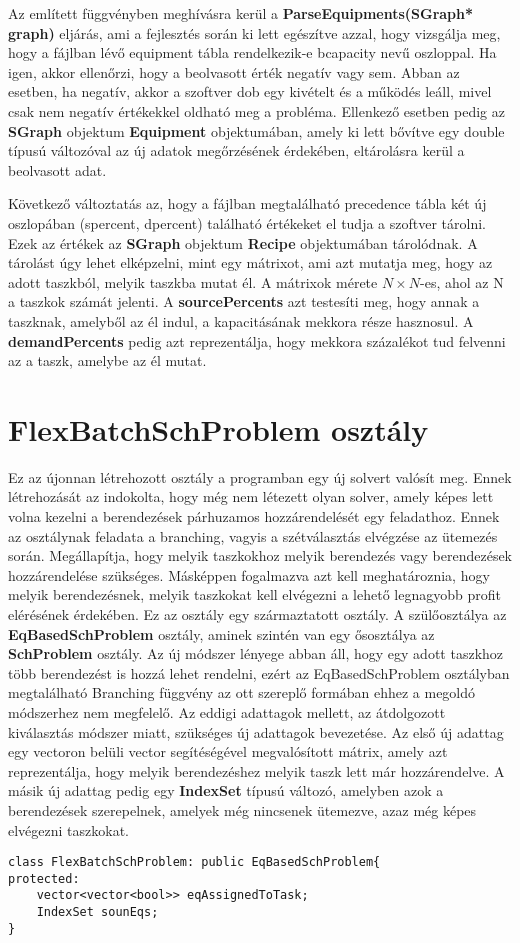 Az említett függvényben meghívásra kerül a \textbf{ParseEquipments(SGraph* graph)} eljárás, ami a fejlesztés során ki lett egészítve azzal, hogy vizsgálja meg, hogy a fájlban lévő equipment tábla rendelkezik-e b\textunderscore capacity nevű oszloppal.
Ha igen, akkor ellenőrzi, hogy a beolvasott érték negatív vagy sem. Abban az esetben, ha negatív, akkor a szoftver dob egy kivételt és a működés leáll, mivel csak nem negatív értékekkel oldható meg a probléma. Ellenkező esetben pedig az \textbf{SGraph} objektum \textbf{Equipment} objektumában, amely ki lett bővítve egy double típusú változóval az új adatok megőrzésének érdekében, eltárolásra kerül a beolvasott adat.

Következő változtatás az, hogy a fájlban megtalálható precedence tábla két új oszlopában (s\textunderscore percent, d\textunderscore percent) található értékeket el tudja a szoftver tárolni. Ezek az értékek az \textbf{SGraph} objektum \textbf{Recipe} objektumában tárolódnak. A tárolást úgy lehet elképzelni, mint egy mátrixot, ami azt mutatja meg, hogy az adott taszkból, melyik taszkba mutat él. A mátrixok mérete $N\times N$-es, ahol az N a taszkok számát jelenti. A \textbf{sourcePercents} azt testesíti meg, hogy annak a taszknak, amelyből az él indul, a kapacitásának mekkora része hasznosul. A \textbf{demandPercents} pedig azt reprezentálja, hogy mekkora százalékot tud felvenni az a taszk, amelybe az él mutat.

\section{FlexBatchSchProblem osztály}
Ez az újonnan létrehozott osztály a programban egy új solvert valósít meg. Ennek létrehozását az indokolta, hogy még nem létezett olyan solver, amely képes lett volna kezelni a berendezések párhuzamos hozzárendelését egy feladathoz. Ennek az osztálynak feladata a branching, vagyis a szétválasztás elvégzése az ütemezés során. Megállapítja, hogy melyik taszkokhoz melyik berendezés vagy berendezések hozzárendelése szükséges. Másképpen fogalmazva azt kell meghatároznia, hogy melyik berendezésnek, melyik taszkokat kell elvégezni a lehető legnagyobb profit elérésének érdekében. Ez az osztály egy származtatott osztály. A szülőosztálya az \textbf{EqBasedSchProblem} osztály, aminek szintén van egy ősosztálya az \textbf{SchProblem} osztály. Az új módszer lényege abban áll, hogy egy adott taszkhoz több berendezést is hozzá lehet rendelni, ezért az EqBasedSchProblem osztályban megtalálható Branching függvény az ott szereplő formában ehhez a megoldó módszerhez nem megfelelő. Az eddigi adattagok mellett, az átdolgozott kiválasztás módszer miatt, szükséges új adattagok bevezetése. Az első új adattag egy vectoron belüli vector segítéségével megvalósított mátrix, amely azt reprezentálja, hogy melyik berendezéshez melyik taszk lett már hozzárendelve. A másik új adattag pedig egy \textbf{IndexSet} típusú változó, amelyben azok a berendezések szerepelnek, amelyek még nincsenek ütemezve, azaz még képes elvégezni taszkokat.
\begin{lstlisting}[caption={FlexBatchSchProblem osztály adattagjai}]
class FlexBatchSchProblem: public EqBasedSchProblem{
protected:
	vector<vector<bool>> eqAssignedToTask;
    IndexSet sounEqs;
}
\end{lstlisting}
